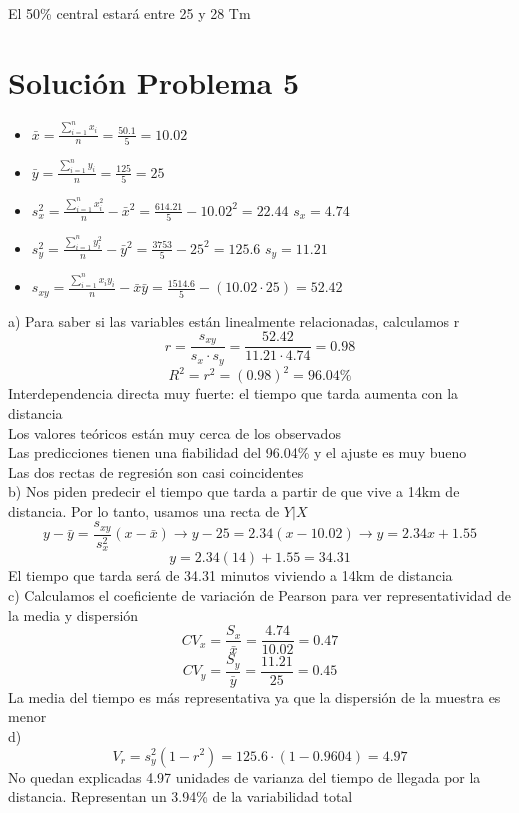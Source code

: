 \documentclass[fleqn]{article}
\begin{document}
	El 50\% central estará entre 25 y 28 Tm 
	\section{Solución Problema 5}
	\begin{itemize}
		\item $\bar{x} = \frac{\sum_{i=1}^n x_i}{n} = \frac{50.1}{5} = 10.02$
		\item $\bar{y} = \frac{\sum_{i=1}^n y_i}{n} = \frac{125}{5} = 25$ 
		\item $s_x^{2} = \frac{\sum_{i=1}^n x_i^{2}}{n} - \bar{x}^{2} = \frac{614.21}{5} - 10.02^{2} = 22.44$ $s_x = 4.74$
		\item $s_y^{2} = \frac{\sum_{i=1}^n y_i^{2}}{n} - \bar{y}^{2} = \frac{3753}{5} - 25^{2} = 125.6$ $s_y = 11.21$
		\item $s_{xy} = \frac{\sum_{i=1}^n x_i y_i}{n} - \bar{x} \bar{y} = \frac{1514.6}{5} - (10.02 \cdot 25) = 52.42$
	\end{itemize}
	a) Para saber si las variables están linealmente relacionadas, calculamos r
	\[
	r = \frac{s_{xy}}{s_x \cdot s_y} = \frac{52.42}{11.21 \cdot 4.74} = \boxed{0.98}
	\]
	\[
	R^2 = r^2 = (0.98)^{2} = \boxed{96.04\%}
	\]
	Interdependencia directa muy fuerte: el tiempo que tarda aumenta con la distancia \\
	Los valores teóricos están muy cerca de los observados \\
	Las predicciones tienen una fiabilidad del 96.04\% y el ajuste es muy bueno \\
	Las dos rectas de regresión son casi coincidentes \\
	b) Nos piden predecir el tiempo que tarda a partir de que vive a 14km de distancia. Por lo tanto, usamos una recta de $Y | X$
	\[
	y - \bar{y} = \frac{s_{xy}}{s_x^{2}} (x - \bar{x}) \rightarrow y - 25 = 2.34(x - 10.02) \rightarrow y = 2.34x + 1.55
	\]
	\[
	y = 2.34(14) + 1.55 = 34.31
	\]
	El tiempo que tarda será de 34.31 minutos viviendo a 14km de distancia\\
	c)  Calculamos el coeficiente de variación de Pearson para ver representatividad de la media y dispersión
	\[
	CV_x = \frac{S_x}{\bar{x}} = \frac{4.74}{10.02} = 0.47
	\] 
	\[
	CV_y = \frac{S_y}{\bar{y}} = \frac{11.21}{25} = 0.45
	\]
	La media del tiempo es más representativa ya que la dispersión de la muestra es menor \\
	d) 
	\[
	V_r = s_y^2 (1-r^2) = 125.6 \cdot (1-0.9604) = \boxed{4.97} 
	\]
	No quedan explicadas 4.97 unidades de varianza del tiempo de llegada por la distancia. Representan un 3.94\% de la variabilidad total \\
\end{document}
